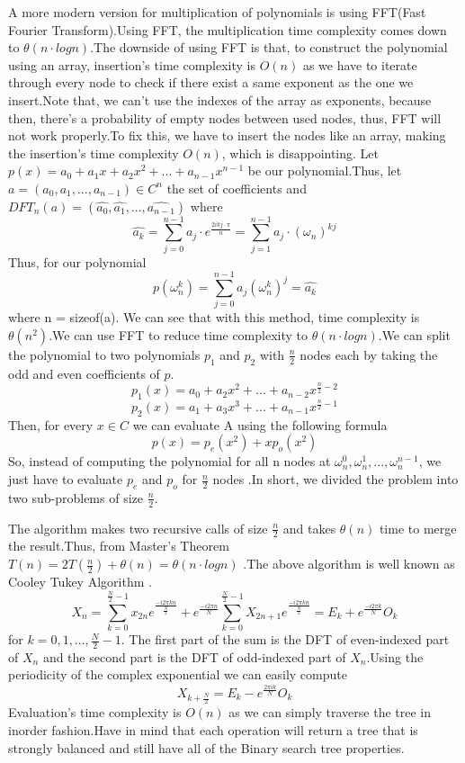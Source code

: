 \documentclass[journal,article,submit,moreauthors,algorithms]{Definitions/mdpi}
\begin{document}
A more modern version for multiplication of polynomials is using FFT(Fast Fourier Transform).Using FFT, the multiplication time complexity comes down to $\theta(n \cdot logn)$.The downside of using FFT is that, to construct the polynomial using an array, insertion's time complexity is $O(n)$ as we have to iterate through every node to check if there exist a same exponent as the one we insert.Note that, we can't use the indexes of the array as exponents, because then, there's a probability of empty nodes between used nodes, thus, FFT will not work properly.To fix this, we have to insert the nodes like an array, making the insertion's time complexity $O(n)$, which is disappointing.
Let $p(x) = a_0 + a_1x + a_2x^2 + ... + a_{n-1}x^{n-1}$ be our polynomial.Thus, let $a = (a_0, a_1, ..., a_{n-1}) \in C^n$ the set of coefficients and $DFT_n(a) = (\hat{a_0}, \hat{a_1}, ..., \hat{a_{n-1}})$ where \[\hat{a_k} = \sum_{j=0}^{n-1}a_j \cdot e^{\frac{2ikj \cdot \pi}{n}} = \sum_{j = 1}^{n - 1}a_j \cdot (\omega_n)^{kj}\]
Thus, for our polynomial \[p(\omega_n^k) = \sum_{j=0}^{n-1} a_j(\omega_n^k)^j = \hat{a_k}\] where n = sizeof(a).
We can see that with this method, time complexity is $\theta(n^2)$.We can use FFT to reduce time complexity to $\theta(n \cdot logn)$.We can split the polynomial to two polynomials $p_1$ and $p_2$ with $\frac{n}{2}$ nodes each by taking the odd and even coefficients of $p$.\[p_1(x) = a_0 + a_2x^2 + ... + a_{n-2}x^{\frac{n}{2}-2}\] \[p_2(x) = a_1 + a_3x^3 + ... + a_{n-1}x^{\frac{n}{2} - 1}\]
Then, for every $x \in C$ we can evaluate A using the following formula \[p(x) = p_e(x^2) + xp_o(x^2)\]
So, instead of computing the polynomial for all n nodes at $\omega^0_n, \omega^1_n, ..., \omega^{n-1}_n$, we just have to evaluate $p_e$ and $p_o$ for $\frac{n}{2}$ nodes \cite{FFT Rec}.In short, we divided the problem into two sub-problems of size $\frac{n}{2}$.

The algorithm makes two recursive calls of size $\frac{n}{2}$ and takes $\theta(n)$ time to merge the result.Thus, from Master's Theorem $T(n) = 2T(\frac{n}{2}) + \theta(n) = \theta(n \cdot logn)$ \cite{Masters Theorem}.The above algorithm is well known as Cooley Tukey Algorithm \cite{Cooley Tukey 2}. \[X_n = \sum_{k = 0}^{\frac{N}{2} - 1} x_{2n}e^{\frac{-i 2 \pi k n}{\frac{N}{2}}} + e^{\frac{-i 2 \pi n}{N}}\sum_{k=0}^{\frac{N}{2} - 1} X_{2n + 1} e^{\frac{-i 2 \pi k n}{\frac{N}{2}}} = E_k + e^{\frac{-i 2 \pi k}{N}} O_k\] for $k = 0,1,...,\frac{N}{2} - 1$.
The first part of the sum is the DFT of even-indexed part of $X_n$ and the second part is the DFT of odd-indexed part of $X_n$.Using the periodicity of the complex exponential we can easily compute \[X_{k + \frac{N}{2}} = E_k - e^{\frac{2 \pi i k}{N}} O_k\]
\medbreak
Evaluation's time complexity is $O(n)$ as we can simply traverse the tree in inorder fashion.Have in mind that each operation will return a tree that is strongly balanced and still have all of the Binary search tree properties.

\end{document}
